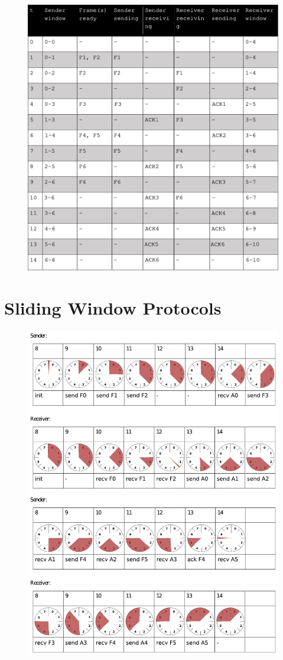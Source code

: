 \documentclass[a4paper, 11 pt, article, accentcolor=tud7b]{tudreport}
\begin{document}
	\begin{figure}[h]
		\centering
		\includegraphics[]{table1.pdf}
	\end{figure}

	\FloatBarrier
	
	\section{Sliding Window Protocols}

	\begin{figure}[h]
		\centering
		\includegraphics[]{table2.pdf}
	\end{figure}
	
\end{document}
